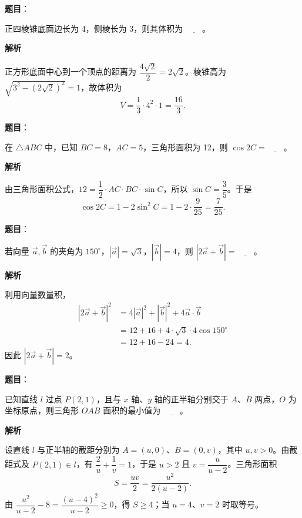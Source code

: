 \begin{answer}

\textbf{题目}：

正四棱锥底面边长为 4，侧棱长为 3，则其体积为 $\underline{\qquad}$。

\textbf{解析}

正方形底面中心到一个顶点的距离为 $\dfrac{4\sqrt2}{2}=2\sqrt2$。棱锥高为 $\sqrt{3^2-(2\sqrt2)^2}=1$，故体积为
\nopagebreak[4]
\[
V=\frac13\cdot4^2\cdot1=\frac{16}{3}.
\]


\end{answer}
\begin{answer}

\textbf{题目}：

在 $\triangle ABC$ 中，已知 $BC=8$，$AC=5$，三角形面积为 12，则 $\cos 2C=\underline{\qquad}$。

\textbf{解析}

由三角形面积公式，$12=\dfrac12\cdot AC\cdot BC\cdot\sin C$，所以 $\sin C=\dfrac35$。于是
\nopagebreak[4]
\[
\cos2C=1-2\sin^2C=1-2\cdot\frac9{25}=\frac7{25}.
\]


\end{answer}
\begin{answer}

\textbf{题目}：

若向量 $\vec a,\vec b$ 的夹角为 $150^\circ$，$|\vec a|=\sqrt3$，$|\vec b|=4$，则 $|2\vec a+\vec b|=\underline{\qquad}$。

\textbf{解析}

利用向量数量积，
\nopagebreak[4]
\[
\begin{aligned}
|2\vec a+\vec b|^2
&=4|\vec a|^2+|\vec b|^2+4\vec a\cdot\vec b\\
&=12+16+4\cdot\sqrt3\cdot4\cos150^\circ\\
&=12+16-24=4.
\end{aligned}
\]
因此 $|2\vec a+\vec b|=2$。


\end{answer}
\begin{answer}

\textbf{题目}：

已知直线 $l$ 过点 $P(2,1)$，且与 $x$ 轴、$y$ 轴的正半轴分别交于 $A\text{、}B$ 两点，$O$ 为坐标原点，则三角形 $OAB$ 面积的最小值为 $\underline{\qquad}$。

\textbf{解析}

设直线 $l$ 与正半轴的截距分别为 $A=(u,0)$、$B=(0,v)$，其中 $u,v>0$。由截距式及 $P(2,1)\in l$，有 $\dfrac2u+\dfrac1v=1$，于是 $u>2$ 且 $v=\dfrac{u}{u-2}$。三角形面积
\nopagebreak[4]
\[
S=\frac{uv}{2}=\frac{u^2}{2(u-2)}.
\]
由 $\dfrac{u^2}{u-2}-8=\dfrac{(u-4)^2}{u-2}\geq0$，得 $S\geq4$；当 $u=4$、$v=2$ 时取等号。


\end{answer}
